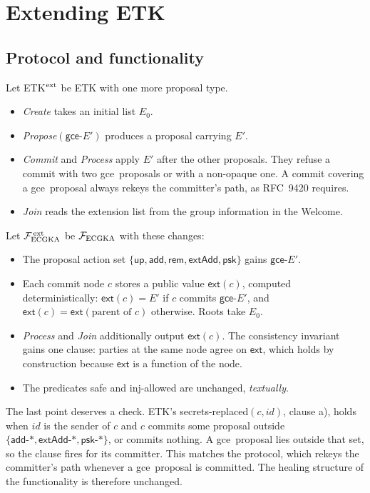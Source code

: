 \documentclass[aps,prx,reprint,superscriptaddress,nofootinbib,floatfix]{revtex4-2}
\theoremstyle{remark}
\newcommand{\gce}{\textsf{gce}}
\newcommand{\ext}{\mathsf{ext}}
\newcommand{\F}{\mathcal F_{\rm ECGKA}}
\newcommand{\Fx}{\mathcal F^{\,\rm ext}_{\rm ECGKA}}
\begin{document}
\section{Extending ETK}

\subsection{Protocol and functionality}

Let ETK$^{\rm ext}$ be ETK with one more proposal type.
\begin{itemize}
\item \emph{Create} takes an initial list $E_0$.
\item \emph{Propose}$(\gce\text{-}E')$ produces a proposal carrying $E'$.
\item \emph{Commit} and \emph{Process} apply $E'$ after the other proposals. They refuse a commit with two \gce\ proposals or with a non-opaque one. A commit covering a \gce\ proposal always rekeys the committer's path, as RFC~9420 requires.
\item \emph{Join} reads the extension list from the group information in the Welcome.
\end{itemize}

Let $\Fx$ be $\F$ with these changes:
\begin{itemize}
\item The proposal action set $\{\textsf{up}, \textsf{add}, \textsf{rem}, \textsf{extAdd}, \textsf{psk}\}$ gains $\gce\text{-}E'$.
\item Each commit node $c$ stores a public value $\ext(c)$, computed deterministically: $\ext(c)=E'$ if $c$ commits $\gce\text{-}E'$, and $\ext(c)=\ext(\text{parent of }c)$ otherwise. Roots take $E_0$.
\item \emph{Process} and \emph{Join} additionally output $\ext(c)$. The consistency invariant gains one clause: parties at the same node agree on $\ext$, which holds by construction because $\ext$ is a function of the node.
\item The predicates \textsf{safe} and \textsf{inj-allowed} are unchanged, \emph{textually}.
\end{itemize}

The last point deserves a check. ETK's \textsf{secrets-replaced}$(c,id)$, clause a), holds when $id$ is the sender of $c$ and $c$ commits some proposal outside $\{\textsf{add-}\ast, \textsf{extAdd-}\ast, \textsf{psk-}\ast\}$, or commits nothing. A \gce\ proposal lies outside that set, so the clause fires for its committer. This matches the protocol, which rekeys the committer's path whenever a \gce\ proposal is committed. The healing structure of the functionality is therefore unchanged.
\end{document}
